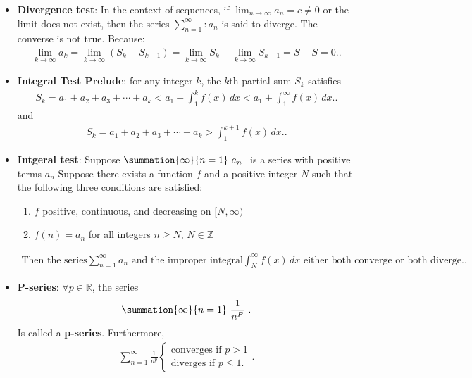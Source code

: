 \documentclass{report}
\begin{document}
\begin{itemize}
    \item \textbf{Divergence test}: In the context of sequences, if $\lim_{{n \to \infty}} a_n = c \neq 0$ or the limit does not exist, then the series $\sum_{{n=1}}^{\infty}: a_n$ is said to diverge. The converse is not true.
        \bigbreak \noindent 
        Because:
        \begin{align*}
            \lim_{k \to \infty} a_k = \lim_{k \to \infty} (S_k - S_{k-1}) = \lim_{k \to \infty} S_k - \lim_{k \to \infty} S_{k-1} = S - S = 0.
        .\end{align*}
    \item \textbf{Integral Test Prelude}:
        for any integer $k$, the $k$th partial sum $S_k$ satisfies
        \begin{align*}
            S_k = a_1 + a_2 + a_3 + \cdots + a_k < a_1 + \int_{1}^{k} f(x) \, dx < a_1 + \int_{1}^{\infty} f(x) \, dx.
        .\end{align*}
        and
        \begin{align*}
            S_k = a_1 + a_2 + a_3 + \cdots + a_k > \int_{1}^{k+1} f(x) \, dx.
        .\end{align*}

    \item \textbf{Intgeral test}:
        Suppose  $\summation{\infty}{n=1}\ a_{n}\  $ is a series with positive terms  $a_{n}$ Suppose there exists a function  $f $
        and a positive integer  $N$ 
        such that the following three conditions are satisfied:
        \begin{enumerate}
            \item \( f \) positive, continuous, and decreasing on $[N,\infty)$
            \item \( f(n) = a_n \) for all integers \( n \geq N \), $N \in \mathbb{Z^{+}} $
        \end{enumerate}
        \begin{align*}
            \text{Then the series} \sum_{n=1}^{\infty} a_n \text{ and the improper integral} \int_{N}^{\infty} f(x) \, dx \text{ either both converge or both diverge.}
        .\end{align*}

    \item \textbf{P-series}:
        $\forall p \in \mathbb{R}$, the series 
        \begin{align*}
            \summation{\infty}{n=1}\ \frac{1}{n^{P}}\ 
        .\end{align*}
        Is called a \textbf{p-series}. Furthermore, 
        \begin{align*}
            \sum_{n=1}^{\infty} \frac{1}{n^p} \begin{cases}
                \text{converges if } p>1 \\
                \text{diverges if } p \leq 1.
            \end{cases}
        .\end{align*}


\end{itemize}
\end{document}
